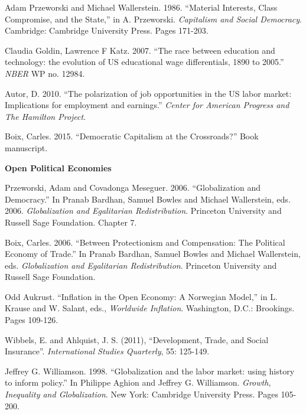 \documentclass[letterpaper]{article}
\renewenvironment{itemize}{
  \begin{list}{}{
    \setlength{\leftmargin}{1.5em}
  }
}{
  \end{list}
}
\begin{document}
\begin{enumerate}
	\begin{itemize}
		\item[$\bullet$] Adam Przeworski and Michael Wallerstein. 1986. ``Material Interests, Class Compromise, and the State,'' in A. Przeworski. \emph{Capitalism and Social Democracy}. Cambridge: Cambridge University Press. Pages 171-203.
		\item[$\bullet$] Claudia Goldin, Lawrence F Katz. 2007. ``The race between education and technology: the evolution of US educational wage differentials, 1890 to 2005.'' \emph{NBER} WP no. 12984.
		\item[$\bullet$] Autor, D. 2010. ``The polarization of job opportunities in the US labor market: Implications for employment and earnings.'' \emph{Center for American Progress and The Hamilton Project}.
		\item[$\bullet$] Boix, Carles. 2015. ``Democratic Capitalism at the Crossroads?'' Book manuscript. 
	\end{itemize}


\item {\bf Open Political Economies}

	\begin{itemize}
		\item[$\bullet$] Przeworski, Adam and Covadonga Meseguer. 2006. ``Globalization and Democracy.'' In Pranab Bardhan, Samuel Bowles and Michael Wallerstein, eds. 2006. \emph{Globalization and Egalitarian Redistribution}. Princeton University and Russell Sage Foundation. Chapter 7.
		\item[$\bullet$] Boix, Carles. 2006. ``Between Protectionism and Compensation: The Political Economy of Trade.'' In Pranab Bardhan, Samuel Bowles and Michael Wallerstein, eds. \emph{Globalization and Egalitarian Redistribution}. Princeton University and Russell Sage Foundation.
		\item[$\bullet$] Odd Aukrust. ``Inflation in the Open Economy: A Norwegian Model,'' in L. Krause and W. Salant, eds., \emph{Worldwide Inflation}. Washington, D.C.: Brookings. Pages 109-126.
		\item[$\bullet$] Wibbels, E. and Ahlquist, J. S. (2011), ``Development, Trade, and Social Insurance''. \emph{International Studies Quarterly}, 55: 125-149.
		\item[$\bullet$] Jeffrey G. Williamson. 1998. ``Globalization and the labor market: using history to inform policy.'' In Philippe Aghion and Jeffrey G. Williamson. \emph{Growth, Inequality and Globalization}. New York: Cambridge University Press. Pages 105-200. 
	\end{itemize}



\end{enumerate}




  


  










%
%
\end{document}
